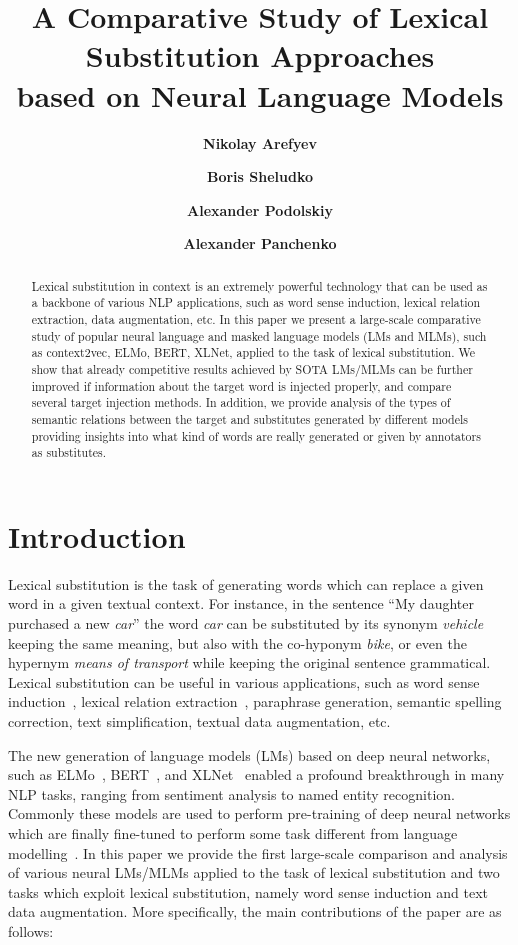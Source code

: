 \documentclass[11pt,a4paper]{article}
\title{A Comparative Study of Lexical Substitution Approaches\\based on Neural Language Models}
\author[$\dag,\ddag$]{\textbf{Nikolay Arefyev}}
\author[$\dag$]{\textbf{Boris Sheludko}}
\author[$\dag$]{\textbf{Alexander Podolskiy}}
\author[$\star$]{\textbf{Alexander Panchenko}}
\affil[$\dag$]{Samsung R\&D Institute Russia, Moscow, Russia}
\affil[$\ddag$]{National Research University Higher School of Economics, Moscow, Russia}
\affil[$\star$]{Skolkovo Institute of Science and Technology, Moscow, Russia}
\date{}
\begin{document}
\maketitle
\begin{abstract}
Lexical substitution in context is an extremely powerful technology that can be used as a backbone of various NLP applications, such as word sense induction, lexical relation extraction, data augmentation, etc. In this paper we present a large-scale comparative study of popular neural language and masked language models (LMs and MLMs), such as context2vec, ELMo, BERT, XLNet, applied to the task of lexical substitution. We show that already competitive results achieved by SOTA LMs/MLMs can be further improved if information about the target word is injected properly, and compare several target injection methods. In addition, we provide analysis of the types of semantic relations between the target and substitutes generated by different models providing insights into what kind of words are really generated or given by annotators as substitutes. 

\end{abstract}


\section{Introduction}

Lexical substitution is the task of generating words which can replace a given word in a given textual context. For instance, in the sentence ``My daughter purchased a new \textit{car}'' the word \textit{car} can be substituted by its synonym \textit{vehicle} keeping the same meaning, but also with the co-hyponym \textit{bike}, or even the hypernym \textit{means of transport} while keeping the original sentence grammatical. Lexical substitution can be useful in various applications, such as word sense induction~\cite{amrami-2018}, lexical relation extraction~\cite{schick2019rare}, paraphrase generation, semantic spelling correction, text simplification, textual data augmentation, etc. 


The new generation of language models (LMs) based on deep neural networks, such as  ELMo~\cite{peters-etal-2018-deep}, BERT~\cite{devlin2018pretraining}, and XLNet~\cite{yang2019xlnet} enabled a profound breakthrough in many NLP tasks, ranging from sentiment analysis to named entity recognition. Commonly these models are used to perform pre-training of deep neural networks which are finally fine-tuned to perform some task different from language modelling~\cite{howard-ruder-2018-universal}. In this paper we provide the first large-scale comparison and analysis of various neural LMs/MLMs applied to the task of lexical substitution and two tasks which exploit lexical substitution, namely word sense induction and text data augmentation. More specifically, the main contributions of the paper are as follows:
\end{document}
